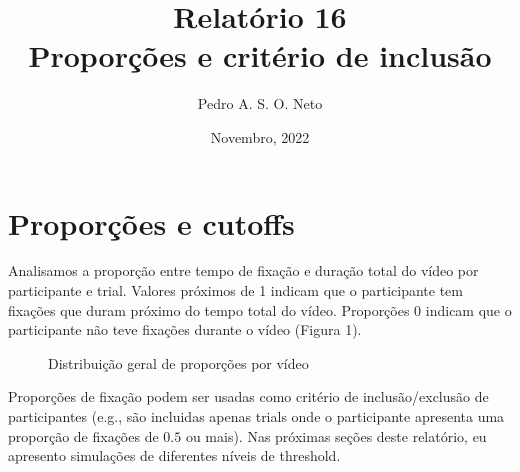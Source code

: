 \documentclass{article}
\title{Relatório 16 \\ Proporções e critério de inclusão}
\author{Pedro A. S. O. Neto}
\date{Novembro, 2022}
\begin{document}
\maketitle

\section{Proporções e cutoffs}

Analisamos a proporção entre tempo de fixação e duração total do vídeo por participante e trial. Valores próximos de 1 indicam que o participante tem fixações que duram próximo do tempo total do vídeo. Proporções 0 indicam que o participante não teve fixações durante o vídeo (Figura 1).

\begin{figure}[]
  \caption{Distribuição geral de proporções por vídeo}
  \noindent{}
  \centering
\end{figure}

Proporções de fixação podem ser usadas como critério de inclusão/exclusão de participantes (e.g., são incluidas apenas trials onde o participante apresenta uma proporção de fixações de $0.5$ ou mais). Nas próximas seções deste relatório, eu apresento simulações de diferentes níveis de threshold.
\end{document}
